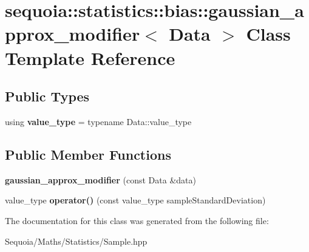 \hypertarget{classsequoia_1_1statistics_1_1bias_1_1gaussian__approx__modifier}{}\section{sequoia\+::statistics\+::bias\+::gaussian\+\_\+approx\+\_\+modifier$<$ Data $>$ Class Template Reference}
\label{classsequoia_1_1statistics_1_1bias_1_1gaussian__approx__modifier}
\subsection*{Public Types}
\begin{DoxyCompactItemize}
\item 
\mbox{\label{classsequoia_1_1statistics_1_1bias_1_1gaussian__approx__modifier_aef44a6aad77df55118bef037a4b9e386}} 
using {\bfseries value\+\_\+type} = typename Data\+::value\+\_\+type
\end{DoxyCompactItemize}
\subsection*{Public Member Functions}
\begin{DoxyCompactItemize}
\item 
\mbox{\label{classsequoia_1_1statistics_1_1bias_1_1gaussian__approx__modifier_accb323baaacea74aa035f84e39f3e723}} 
{\bfseries gaussian\+\_\+approx\+\_\+modifier} (const Data \&data)
\item 
\mbox{\label{classsequoia_1_1statistics_1_1bias_1_1gaussian__approx__modifier_a7e021cc22cce75cc4848906209fdd0d1}} 
value\+\_\+type {\bfseries operator()} (const value\+\_\+type sample\+Standard\+Deviation)
\end{DoxyCompactItemize}


The documentation for this class was generated from the following file\+:\begin{DoxyCompactItemize}
\item 
Sequoia/\+Maths/\+Statistics/Sample.\+hpp\end{DoxyCompactItemize}
